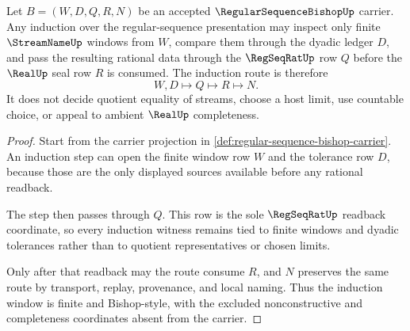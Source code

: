 \begin{theorem}
\label{thm:regular-sequence-bishop-induction-window}
Let $B=(W,D,Q,R,N)$ be an accepted $\RegularSequenceBishopUp$ carrier. Any induction over the regular-sequence presentation may inspect only finite $\StreamNameUp$ windows from $W$, compare them through the dyadic ledger $D$, and pass the resulting rational data through the $\RegSeqRatUp$ row $Q$ before the $\RealUp$ seal row $R$ is consumed. The induction route is therefore
$$
W,D \longmapsto Q \longmapsto R \longmapsto N .
$$
It does not decide quotient equality of streams, choose a host limit, use countable choice, or appeal to ambient $\RealUp$ completeness.
\end{theorem}
\begin{proof}
Start from the carrier projection in \autoref{def:regular-sequence-bishop-carrier}. An induction step can open the finite window row $W$ and the tolerance row $D$, because those are the only displayed sources available before any rational readback.

The step then passes through $Q$. This row is the sole $\RegSeqRatUp$ readback coordinate, so every induction witness remains tied to finite windows and dyadic tolerances rather than to quotient representatives or chosen limits.

Only after that readback may the route consume $R$, and $N$ preserves the same route by transport, replay, provenance, and local naming. Thus the induction window is finite and Bishop-style, with the excluded nonconstructive and completeness coordinates absent from the carrier.
\end{proof}




